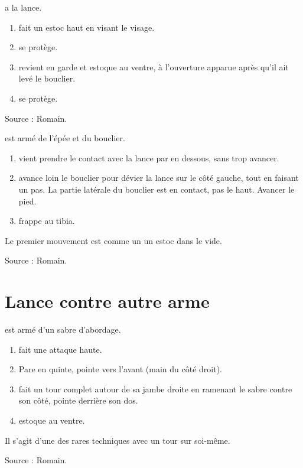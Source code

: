 \begin{exercice}
\A a la lance.

\begin{enumerate}
	\item \A fait un estoc haut en visant le visage.
	
	\item \D se protège.
	
	\item \A revient en garde et estoque \D au ventre, à l'ouverture apparue après qu'il ait levé le bouclier.
	
	\item \D se protège.
\end{enumerate}

Source : Romain.
\end{exercice}


\begin{technique}
\A est armé de l'épée et du bouclier.

\begin{enumerate}
	\item \A vient prendre le contact avec la lance par en dessous, sans trop avancer.
	
	\item \A avance loin le bouclier pour dévier la lance sur le côté gauche, tout en faisant un pas.
	La partie latérale du bouclier est en contact, pas le haut.
	Avancer le pied.

	\item \A frappe \D au tibia.
\end{enumerate}

Le premier mouvement est comme un un estoc dans le vide.

Source : Romain.
\end{technique}


\section{Lance contre autre arme}


\begin{technique}
\D est armé d'un sabre d'abordage.

\begin{enumerate}
	\item \A fait une attaque haute.
	
	\item \D Pare en quinte, pointe vers l'avant (main du côté droit).
	
	\item \D fait un tour complet autour de sa jambe droite en ramenant le sabre contre son côté, pointe derrière son dos.
	
	\item \D estoque \A au ventre.
\end{enumerate}

Il s'agit d'une des rares techniques avec un tour sur soi-même.

Source : Romain.
\end{technique}



